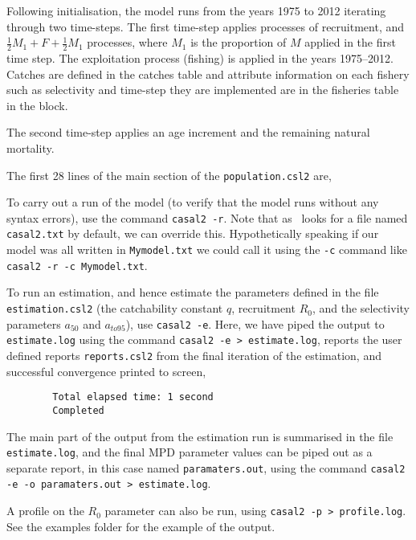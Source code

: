 Following initialisation, the model runs from the years 1975 to 2012 iterating through two time-steps. The first time-step applies processes of recruitment, and  $\frac{1}{2} M_1 + F + \frac{1}{2} M_1$ processes, where $M_1$ is the proportion of $M$ applied in the first time step. The exploitation process (fishing) is applied in the years 1975--2012. Catches are defined in the catches table and attribute information on each fishery such as selectivity and time-step they are implemented are in the fisheries table in the  block.

The second time-step applies an age increment and the remaining natural mortality.

The first 28 lines of the main section of the \texttt{population.csl2} are,
% 

To carry out a run of the model (to verify that the model runs without any syntax errors), use the command \texttt{casal2 -r}. Note that as \IBM\ looks for a file named \texttt{casal2.txt} by default, we can override this. Hypothetically speaking if our model was all written in \texttt{Mymodel.txt} we could call it using the \texttt{-c} command like \texttt{casal2 -r -c Mymodel.txt}.

To run an estimation, and hence estimate the parameters defined in the file \texttt{estimation.csl2} (the catchability constant $q$, recruitment $R_0$, and the selectivity parameters $a_{50}$ and $a_{to95}$), use  \texttt{casal2 -e}. Here, we have piped the output to \texttt{estimate.log} using the command \texttt{casal2 -e > estimate.log}, reports the user defined reports \texttt{reports.csl2} from the final iteration of the estimation, and successful convergence printed to screen,
{\small{\begin{verbatim}
		Total elapsed time: 1 second
		Completed
		\end{verbatim}}}

The main part of the output from the estimation run is summarised in the file \texttt{estimate.log}, and the final MPD parameter values can be piped out as a separate report, in this case named \texttt{paramaters.out}, using the command \texttt{casal2 -e -o paramaters.out > estimate.log}.

A profile on the $R_0$ parameter can also be run, using \texttt{casal2 -p > profile.log}. See the examples folder for the example of the output.







